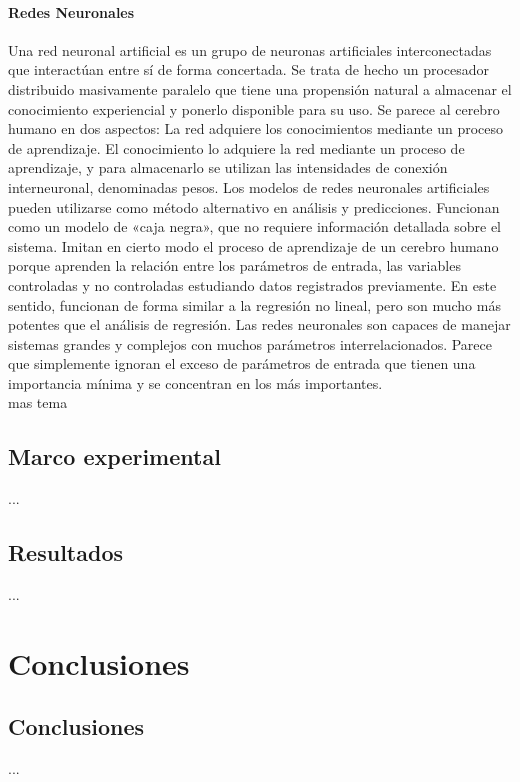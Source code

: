 \documentclass[spanish,11pt,letterpaper,oneside]{memoir}
\begin{document}
\subsection{Redes Neuronales}
	Una red neuronal artificial es un grupo de neuronas artificiales interconectadas que interactúan entre sí de forma concertada. Se trata de hecho un procesador distribuido masivamente paralelo que tiene una propensión natural a almacenar el conocimiento experiencial y ponerlo disponible para su uso. Se parece al cerebro humano en dos aspectos: La red adquiere los conocimientos mediante un proceso de aprendizaje.	
	El conocimiento lo adquiere la red mediante un proceso de aprendizaje, y para almacenarlo se utilizan las intensidades de conexión interneuronal, denominadas pesos. Los modelos de redes neuronales artificiales pueden utilizarse como método alternativo en análisis y predicciones. Funcionan como un modelo de «caja negra», que no requiere información detallada sobre el sistema. Imitan en cierto modo el proceso de aprendizaje de un cerebro humano porque aprenden la relación entre los parámetros de entrada, las variables controladas y no controladas estudiando datos registrados previamente. En este sentido, funcionan de forma similar a la regresión no lineal, pero son mucho más potentes que el análisis de regresión. Las redes neuronales son capaces de manejar sistemas grandes y complejos con muchos parámetros interrelacionados. Parece que simplemente ignoran el exceso de parámetros de entrada que tienen una importancia mínima y se concentran en los más importantes. \\
	 mas tema
	


\chapter{Marco experimental}

...

\chapter{Resultados}

...

\part{Conclusiones}
\chapter{Conclusiones}

...


 
\end{document}
